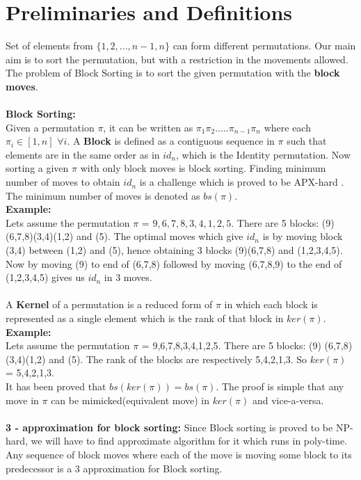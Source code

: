 \documentclass[BTech]{iitmdiss}
\begin{document}
\section{Preliminaries and Definitions}
Set of elements from $\{1,2,...,n-1,n\}$ can form different permutations. Our main aim is to sort the permutation, but with a restriction in the movements allowed. The problem of Block Sorting is to sort the given permutation with the \textbf{block moves}.\\~\\
\textbf{Block Sorting:}\\
Given a permutation $\pi$, it can be written as $\pi_1\pi_2.....\pi_{n-1}\pi_{n}$ where each $\pi_i \in [1,n]$ $\forall i$. A \textbf{Block} is defined as a contiguous sequence in $\pi$ such that elements are in the same order as in $id_n$, which is the Identity permutation. Now sorting a given $\pi$ with only block moves is block sorting. Finding minimum number of moves to obtain $id_n$ is a challenge which is proved to be APX-hard \citep{narayanaswamy2015block}. The minimum number of moves is denoted as $bs(\pi)$.\\
\textbf{Example:}\\
Lets assume the permutation $\pi$ = $9,6,7,8,3,4,1,2,5.$ There are 5 blocks: (9) 	(6,7,8)(3,4)(1,2) and (5). The optimal moves which give $id_n$ is by moving block (3,4) between (1,2) and (5), hence obtaining 3 blocks (9)(6,7,8) and (1,2,3,4,5). Now by moving (9) to end of (6,7,8) followed by moving (6,7,8,9) to the end of (1,2,3,4,5) gives us $id_n$ in 3 moves.\\~\\
\noindent
A \textbf{Kernel} of a permutation is a reduced form of $\pi$ in which each block is represented as a single element which is the rank of that block in $ker(\pi)$.\\
\textbf{Example:}\\
Lets assume the permutation $\pi$ = 9,6,7,8,3,4,1,2,5. There are 5 blocks: (9)
(6,7,8)(3,4)(1,2) and (5). The rank of the blocks are respectively 5,4,2,1,3. So $ker(\pi)$ = 5,4,2,1,3.\\
It has been proved that $bs(ker(\pi)) = bs(\pi)$. The proof is simple that any move in $\pi$ can be mimicked(equivalent move) in $ker(\pi)$ and vice-a-versa.\\~\\
\noindent
\textbf{3 - approximation for block sorting:} 
Since Block sorting is proved to be NP-hard, we will have to find approximate algorithm for it which runs in poly-time. Any sequence of block moves where each of the move is moving some block to its predecessor is a 3 approximation for Block sorting.\\
\end{document}
